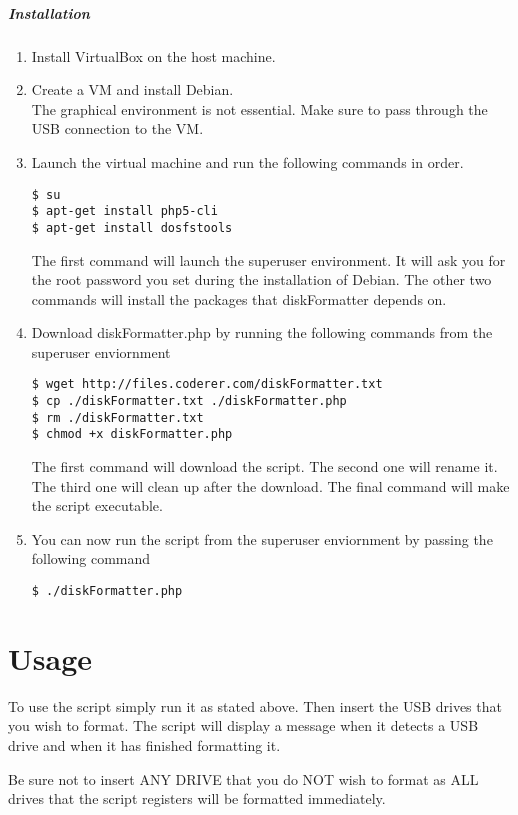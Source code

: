 \documentclass{article}
\begin{document}
\subparagraph{Installation}
\begin{enumerate}
\item Install VirtualBox on the host machine.
\item Create a VM and install Debian. \\ The graphical environment is not essential. Make sure to pass through the USB connection to the VM.
\item Launch the virtual machine and run the following commands in order. \begin{verbatim}$ su
$ apt-get install php5-cli 
$ apt-get install dosfstools\end{verbatim}
The first command will launch the superuser environment. It will ask you for the root password you set during the installation of Debian. The other two commands will install the packages that diskFormatter depends on.
\item Download diskFormatter.php by running the following commands from the superuser enviornment \begin{verbatim}$ wget http://files.coderer.com/diskFormatter.txt
$ cp ./diskFormatter.txt ./diskFormatter.php
$ rm ./diskFormatter.txt
$ chmod +x diskFormatter.php\end{verbatim}
The first command will download the script. The second one will rename it. The third one will clean up after the download. The final command will make the script executable.
\item You can now run the script from the superuser enviornment by passing the following command\begin{verbatim}$ ./diskFormatter.php\end{verbatim} 
\end{enumerate}


\section{Usage}
To use the script simply run it as stated above. Then insert the USB drives that you wish to format. The script will display a message when it detects a USB drive and when it has finished formatting it.

Be sure not to insert ANY DRIVE that you do NOT wish to format as ALL drives that the script registers will be formatted immediately.
\end{document}
